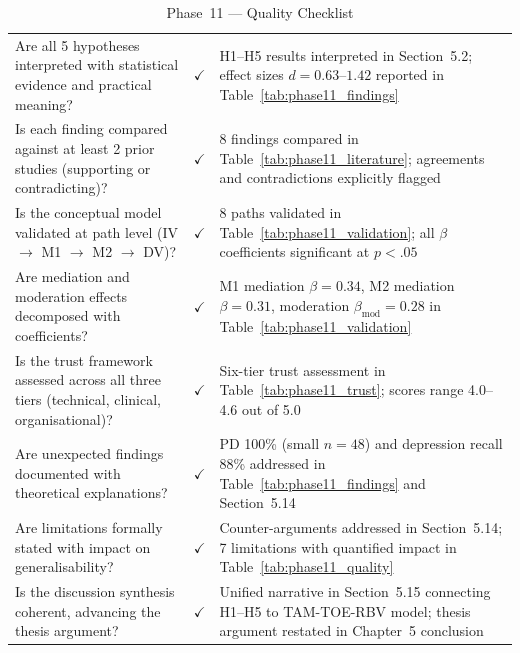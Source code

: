 \begingroup\singlespacing\tablefontsize\tablestripes
\begin{xltabular}{\textwidth}{@{} X c X @{}}
\caption{Phase~11 --- Quality Checklist}
\label{tab:phase11_checklist}\\
\toprule
{} &  &  \\
\midrule
\endfirsthead
\endhead
\bottomrule
\endlastfoot
Are all 5 hypotheses interpreted with statistical evidence and practical meaning?          & $\checkmark$ & H1--H5 results interpreted in Section~5.2; effect sizes $d = 0.63$--$1.42$ reported in Table~\ref{tab:phase11_findings} \\
\addlinespace
Is each finding compared against at least 2 prior studies (supporting or contradicting)?   & $\checkmark$ & 8 findings compared in Table~\ref{tab:phase11_literature}; agreements and contradictions explicitly flagged \\
\addlinespace
Is the conceptual model validated at path level (IV $\rightarrow$ M1 $\rightarrow$ M2 $\rightarrow$ DV)? & $\checkmark$ & 8 paths validated in Table~\ref{tab:phase11_validation}; all $\beta$ coefficients significant at $p < .05$ \\
\addlinespace
Are mediation and moderation effects decomposed with coefficients?                         & $\checkmark$ & M1 mediation $\beta = 0.34$, M2 mediation $\beta = 0.31$, moderation $\beta_{\text{mod}} = 0.28$ in Table~\ref{tab:phase11_validation} \\
\addlinespace
Is the trust framework assessed across all three tiers (technical, clinical, organisational)? & $\checkmark$ & Six-tier trust assessment in Table~\ref{tab:phase11_trust}; scores range 4.0--4.6 out of 5.0 \\
\addlinespace
Are unexpected findings documented with theoretical explanations?                           & $\checkmark$ & PD 100\% (small $n = 48$) and depression recall 88\% addressed in Table~\ref{tab:phase11_findings} and Section~5.14 \\
\addlinespace
Are limitations formally stated with impact on generalisability?                            & $\checkmark$ & Counter-arguments addressed in Section~5.14; 7 limitations with quantified impact in Table~\ref{tab:phase11_quality} \\
\addlinespace
Is the discussion synthesis coherent, advancing the thesis argument?                        & $\checkmark$ & Unified narrative in Section~5.15 connecting H1--H5 to TAM-TOE-RBV model; thesis argument restated in Chapter~5 conclusion \\
\end{xltabular}
\endgroup

